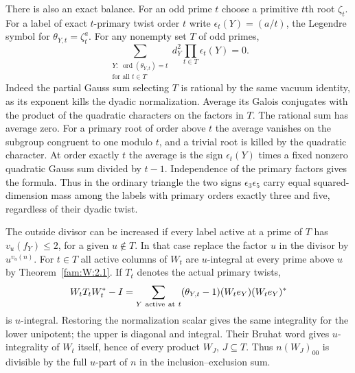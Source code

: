 \documentclass[11pt,a4paper]{article}
\numberwithin{equation}{section}
\theoremstyle{remark}
\begin{document}
There is also an exact balance. For an odd prime $t$ choose a primitive
$t$th root $\zeta_t$. For a label of exact $t$-primary twist order $t$
write $\epsilon_t(Y)=(a/t)$, the Legendre symbol for
$\theta_{Y,t}=\zeta_t^a$. For any nonempty set $T$ of odd primes,
\[
 \sum_{\substack{Y:\;\operatorname{ord}(\theta_{Y,t})=t\\
                       \text{for all }t\in T}}
 d_Y^2\prod_{t\in T}\epsilon_t(Y)=0.
\]
Indeed the partial Gauss sum selecting $T$ is rational by the same
vacuum identity, as its exponent kills the dyadic normalization.
Average its Galois conjugates with the product of the quadratic
characters on the factors in $T$. The rational sum has average zero.
For a primary root of order above $t$ the average vanishes on the
subgroup congruent to one modulo $t$, and a trivial root is killed by
the quadratic character. At order exactly $t$ the average is the sign
$\epsilon_t(Y)$ times a fixed nonzero quadratic Gauss sum divided by
$t-1$. Independence of the primary factors gives the formula. Thus in
the ordinary triangle the two signs $\epsilon_3\epsilon_5$ carry
equal squared-dimension mass among the labels with primary orders
exactly three and five, regardless of their dyadic twist.

The outside divisor can be increased if every label active at a prime
of $T$ has $v_u(f_Y)\le2$, for a given $u\notin T$. In that case
replace the factor $u$ in the divisor by $u^{v_u(n)}$. For $t\in T$
all active columns of $W_t$ are $u$-integral at every prime above $u$
by Theorem~\ref{fam:W:2.1}. If $T_t$ denotes the actual primary twists,
\[
 W_tT_t W_t^*-I=\sum_{Y\ {\rm active\ at}\ t}
 (\theta_{Y,t}-1)(W_te_Y)(W_te_Y)^*
\]
is $u$-integral. Restoring the normalization scalar gives the same
integrality for the lower unipotent; the upper is diagonal and
integral. Their Bruhat word gives $u$-integrality of $W_t$ itself,
hence of every product $W_J$, $J\subseteq T$. Thus $n(W_J)_{00}$ is
divisible by the full $u$-part of $n$ in the inclusion--exclusion sum.
\end{document}
